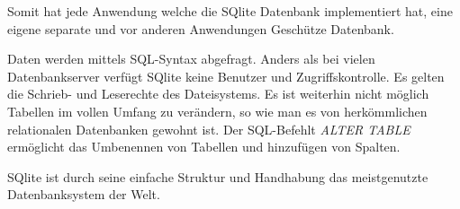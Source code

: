 Somit hat jede Anwendung welche die SQlite Datenbank implementiert hat, eine eigene separate und vor anderen Anwendungen Geschütze Datenbank.

Daten werden mittels SQL-Syntax abgefragt. Anders als bei vielen Datenbankserver verfügt SQlite keine Benutzer und Zugriffskontrolle. Es gelten die Schrieb- und Leserechte des Dateisystems. Es ist weiterhin nicht möglich Tabellen im vollen Umfang zu verändern, so wie man es von herkömmlichen relationalen Datenbanken gewohnt ist. Der SQL-Befehlt \textit{ALTER TABLE} ermöglicht das Umbenennen von Tabellen und hinzufügen von Spalten.

SQlite ist durch seine einfache Struktur und Handhabung das meistgenutzte Datenbanksystem der Welt.